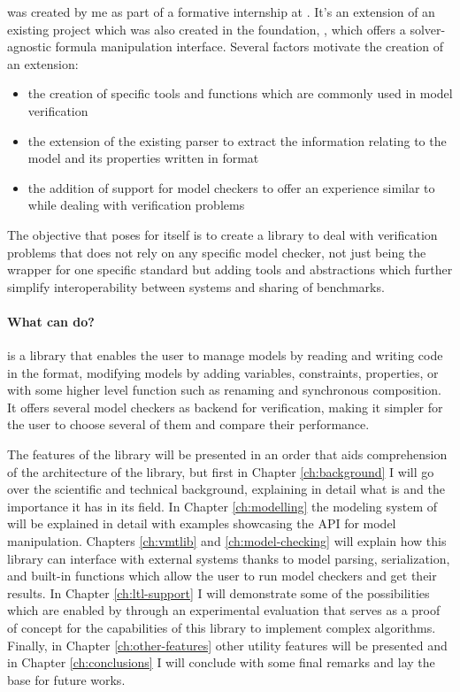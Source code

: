 \pyvmt{} was created by me as part of a formative internship at \FBK{}. It's an extension of an existing project which was also created in the foundation, \pysmt{}, which offers a solver-agnostic formula manipulation interface.
Several factors motivate the creation of an extension:
\begin{itemize}
  \item the creation of specific tools and functions which are commonly used in model verification
  \item the extension of the existing \smtlib{} parser to extract the information relating to the model and its properties written in \vmtlib{} format
  \item the addition of support for model checkers to offer an experience similar to \pysmt{} while dealing with verification problems
\end{itemize}

The objective that \pyvmt{} poses for itself is to create a library to deal with verification problems that does not rely on any specific model checker, not just being the wrapper for one specific standard but adding tools and abstractions which further simplify interoperability between systems and sharing of benchmarks.

\paragraph*{What can \pyvmt{} do?}
\pyvmt{} is a \python{} library that enables the user to manage \vmt{} models by reading and writing code in the \vmtlib{} format, modifying models by adding variables, constraints, properties, or with some higher level function such as renaming and synchronous composition. It offers several model checkers as backend for verification, making it simpler for the user to choose several of them and compare their performance.

The features of the library will be presented in an order that aids comprehension of the architecture of the library, but first in Chapter \ref{ch:background} I will go over the scientific and technical background, explaining in detail what \pysmt{} is and the importance it has in its field.
In Chapter \ref{ch:modelling} the modeling system of \pyvmt{} will be explained in detail with examples showcasing the API for model manipulation.
Chapters \ref{ch:vmtlib} and \ref{ch:model-checking} will explain how this library can interface with external systems thanks to model parsing, serialization, and built-in functions which allow the user to run model checkers and get their results.
In Chapter \ref{ch:ltl-support} I will demonstrate some of the possibilities which are enabled by \pyvmt{} through an experimental evaluation that serves as a proof of concept for the capabilities of this library to implement complex algorithms.
Finally, in Chapter \ref{ch:other-features} other utility features will be presented and in Chapter \ref{ch:conclusions} I will conclude with some final remarks and lay the base for future works.

